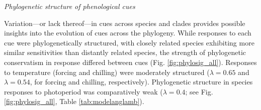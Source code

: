 \documentclass[11pt]{article}
\begin{document}
\emph{Phylogenetic structure of phenological cues}

Variation---or lack thereof---in cues across species and clades provides possible insights into the evolution of cues across the phylogeny. While responses to each cue were phylogenetically structured, with closely related species exhibiting more similar sensitivities than distantly related species, the strength of phylogenetic conservatism in response differed between cues (Fig. \ref{fig:phylosig_all}). Responses to temperature (forcing and chilling) were moderately structured ($\lambda = 0.65$ and $\lambda = 0.54$, for forcing and chilling, respectively). Phylogenetic structure in species responses to photoperiod was comparatively weak ($\lambda= 0.4$; see Fig. \ref{fig:phylosig_all}, Table \ref{tab:modelanglamb}). %
\end{document}
